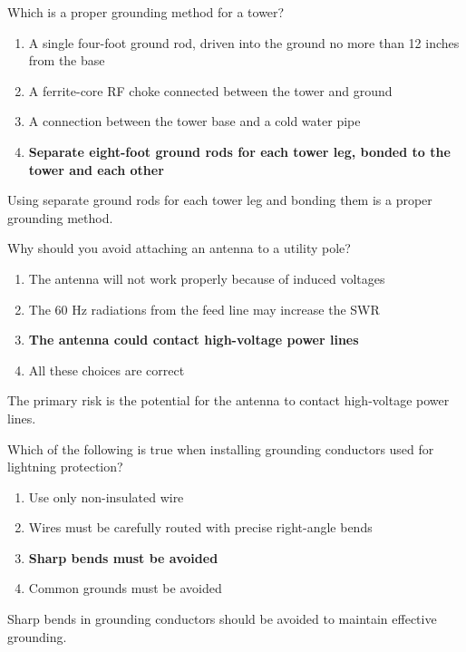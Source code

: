 \begin{tcolorbox}[colback=gray!10!white,colframe=black!75!black,title={T0B08}]
Which is a proper grounding method for a tower?
\begin{enumerate}[label=\Alph*),noitemsep]
    \item A single four-foot ground rod, driven into the ground no more than 12 inches from the base
    \item A ferrite-core RF choke connected between the tower and ground
    \item A connection between the tower base and a cold water pipe
    \item \textbf{Separate eight-foot ground rods for each tower leg, bonded to the tower and each other}
\end{enumerate}
\end{tcolorbox}
Using separate ground rods for each tower leg and bonding them is a proper grounding method.

\begin{tcolorbox}[colback=gray!10!white,colframe=black!75!black,title={T0B09}]
Why should you avoid attaching an antenna to a utility pole?
\begin{enumerate}[label=\Alph*),noitemsep]
    \item The antenna will not work properly because of induced voltages
    \item The 60 Hz radiations from the feed line may increase the SWR
    \item \textbf{The antenna could contact high-voltage power lines}
    \item All these choices are correct
\end{enumerate}
\end{tcolorbox}
The primary risk is the potential for the antenna to contact high-voltage power lines.

\begin{tcolorbox}[colback=gray!10!white,colframe=black!75!black,title={T0B10}]
Which of the following is true when installing grounding conductors used for lightning protection?
\begin{enumerate}[label=\Alph*),noitemsep]
    \item Use only non-insulated wire
    \item Wires must be carefully routed with precise right-angle bends
    \item \textbf{Sharp bends must be avoided}
    \item Common grounds must be avoided
\end{enumerate}
\end{tcolorbox}
Sharp bends in grounding conductors should be avoided to maintain effective grounding.

